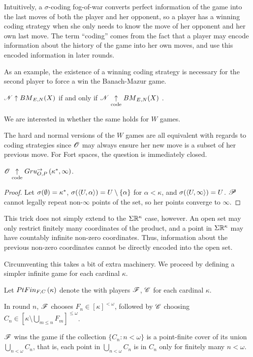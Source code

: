 Intuitively, a $\sigma$-coding fog-of-war converts perfect information of the
game into the last moves of both the player and her opponent, so a player has
a winning coding strategy when she only needs to know the move of her opponent
and her own last move. The term ``coding'' comes from the fact
that a player may encode information about the history of the game into
her own moves, and use this encoded information in later rounds.

As an example, the existence of a winning coding strategy is necessary for the
second player to force a win the Banach-Mazur game.

\begin{thm}\label{bmcode}
  $\mathscr{N}\uparrow{BM}_{E,N}(X)$ if and only if $\mathscr{N}\underset{\text{code}}{\uparrow}{BM}_{E,N}(X)$
  \cite{MR817083} \cite{MR831181}.
\end{thm}

We are interested in whether the same holds for $W$ games.

The hard and normal versions of the $W$ games are all equivalent with regards
to coding strategies since $\mathscr{O}$
may always ensure her new move is a subset of her previous move. For
Fort spaces, the question is immediately closed.

\begin{prop}
  $\mathscr{O} \underset{\text{code}}{\uparrow} Gru_{O,P}^{\to}\left({\kappa^*},{\infty}\right)$.
\end{prop}

\begin{proof}
  Let $\sigma(\emptyset)=\kappa^*$,
  $\sigma(\langle U,\alpha\rangle)=U\setminus\{\alpha\}$ for $\alpha<\kappa$,
  and $\sigma(\langle U,\infty\rangle)=U$. $\mathscr{P}$
  cannot legally repeat non-$\infty$ points of the set, so her points converge
  to $\infty$.
\end{proof}

This trick does not simply extend to the $\Sigma\mathbb{R}^{\kappa}$ case, however.
An open set may only restrict finitely many coordinates of the product,
and a point in $\Sigma\mathbb{R}^{\kappa}$ may have countably infinite non-zero
coordinates. Thus, information about the previous non-zero coordinates cannot be
directly encoded into the open set.

Circumventing this takes a bit of extra machinery. We proceed by defining
a simpler infinite game for each cardinal $\kappa$.

\begin{game}
  Let $PtFin_{F,C}\left({\kappa}\right)$ denote the  with players
  $\mathscr{F}$, $\mathscr{C}$ for each cardinal $\kappa$.

  In round $n$, $\mathscr{F}$ chooses $F_n\in[\kappa]^{<\omega}$, followed by
  $\mathscr{C}$ choosing $C_n\in[\kappa\setminus\bigcup_{m\leq n}F_m]^{\leq\omega}$.

  $\mathscr{F}$ wins the game if the collection $\{C_n:n<\omega\}$ is a point-finite
  cover of its union $\bigcup_{n<\omega} C_n$, that is, each point in
  $\bigcup_{n<\omega} C_n$ is in $C_n$ only for finitely many $n<\omega$.
\end{game}

